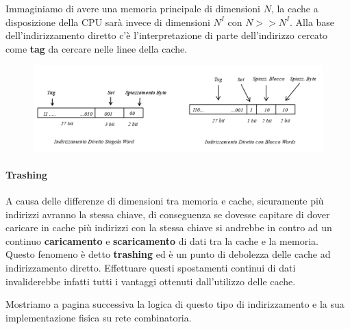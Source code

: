\documentclass{article}
\begin{document}
Immaginiamo di avere una memoria principale di dimensioni $N$, la cache a disposizione della CPU sarà invece di dimensioni $N^{I}$ con $N >> N^{I}$. Alla base dell'indirizzamento diretto c'è l'interpretazione di parte dell'indirizzo cercato come \textbf{tag} da cercare nelle linee della cache. 

\begin{figure}[htbp]
    \center
    \includegraphics[scale=0.425]{img/indirizzamento_diretto_indirizzi.png}
\end{figure}

\paragraph{Trashing} A causa delle differenze di dimensioni tra memoria e cache, sicuramente più indirizzi avranno la stessa chiave, di conseguenza se dovesse capitare di dover caricare in cache più indirizzi con la stessa chiave si andrebbe in contro ad un continuo \textbf{caricamento} e \textbf{scaricamento} di dati tra la cache e la memoria. Questo fenomeno è detto \textbf{trashing} ed è un punto di debolezza delle cache ad indirizzamento diretto. Effettuare questi spostamenti continui di dati invaliderebbe infatti tutti i vantaggi ottenuti dall'utilizzo delle cache.

\vspace*{5px}

Mostriamo a pagina successiva la logica di questo tipo di indirizzamento e la sua implementazione fisica su rete combinatoria.

\newpage
\end{document}
